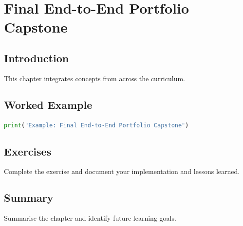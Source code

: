 \chapter{Final End-to-End Portfolio Capstone}
\label{chap:vol11-10}



\section{Introduction}
This chapter integrates concepts from across the curriculum.

\section{Worked Example}
\begin{lstlisting}[language=Python]
print("Example: Final End-to-End Portfolio Capstone")
\end{lstlisting}

\section{Exercises}
\begin{exercise}
Complete the exercise and document your implementation and lessons learned.
\end{exercise}

\section{Summary}
Summarise the chapter and identify future learning goals.
